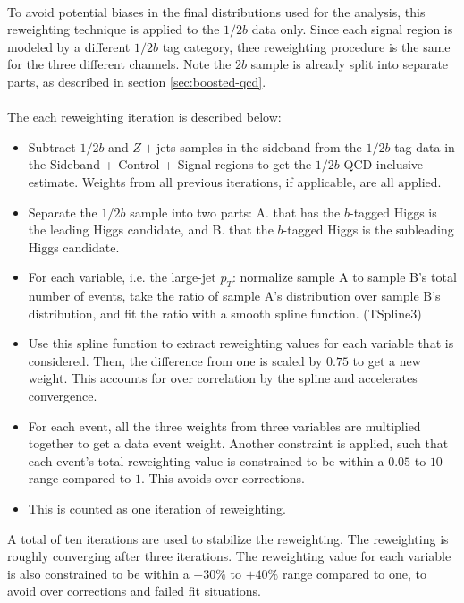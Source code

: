 \paragraph{}
To avoid potential biases in the final distributions used for the analysis, this reweighting technique is applied to the $1/2b$ data only. 
Since each signal region is modeled by a different $1/2b$ tag category, thee reweighting procedure is the same for the three different channels. 
Note the $2b$ sample is already split into separate parts, as described in section \ref{sec:boosted-qcd}.

\clearpage{}
\paragraph{}
The each reweighting iteration is described below:
\begin{itemize}
\item Subtract $1/2b$ \ttbar and $Z+$jets samples in the sideband from the $1/2b$ tag data in the Sideband + Control + Signal regions to get the $1/2b$ QCD inclusive estimate. Weights from all previous iterations, if applicable, are all applied.
\item Separate the $1/2b$ sample into two parts: A. that has the $b$-tagged Higgs is the leading \pt Higgs candidate, and B. that the $b$-tagged Higgs is the subleading \pt Higgs candidate.
\item For each variable, i.e. the large-\R jet $p_{T}$: normalize sample A to sample B's total number of events, take the ratio of sample A's distribution over sample B's distribution, and fit the ratio with a smooth spline function. (TSpline3)
\item Use this spline function to extract reweighting values for each variable that is considered. Then, the difference from one is scaled by $0.75$ to get a new weight. This accounts for over correlation by the spline and accelerates convergence.
\item For each event, all the three weights from three variables are multiplied together to get a data event weight. Another constraint is applied, such that each event's total reweighting value is constrained to be within a $0.05$ to $10$ range compared to $1$. This avoids over corrections.
\item This is counted as one iteration of reweighting. 
\end{itemize}
A total of ten iterations are used to stabilize the reweighting. 
The reweighting is roughly converging after three iterations.
The reweighting value for each variable is also constrained to be within a $-30\%$ to $+40\%$ range compared to one, to avoid over corrections and failed fit situations.


